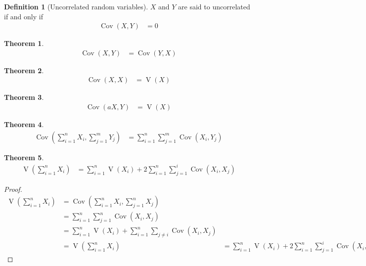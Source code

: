 \documentclass[titlepage, fleqn, a4paper, 12pt, twoside]{article}
\theoremstyle{definition}
\newtheorem{definition}{Definition}
\theoremstyle{theorem}
\newtheorem{theorem}{Theorem}
\DeclareMathOperator{\var}{\mathrm{V}}
\DeclareMathOperator{\cov}{\mathrm{Cov}}
\begin{document}
\begin{definition}[Uncorrelated random variables]
	$X$ and $Y$ are said to uncorrelated if and only if
	\begin{align*}
		\cov(X,Y) & = 0
	\end{align*}
\end{definition}

\begin{theorem}
	\begin{align*}
		\cov(X,Y) & = \cov(Y,X)
	\end{align*}
\end{theorem}

\begin{theorem}
	\begin{align*}
		\cov(X,X) & = \var(X)
	\end{align*}
\end{theorem}

\begin{theorem}
	\begin{align*}
		\cov(a X,Y) & = \var(X)
	\end{align*}
\end{theorem}

\begin{theorem}
	\begin{align*}
		\cov\left( \sum\limits_{i = 1}^{n} X_i , \sum\limits_{j = 1}^{m} Y_j \right) & = \sum\limits_{i = 1}^{n} \sum\limits_{j = 1}^{m} \cov(X_i,Y_j)
	\end{align*}
\end{theorem}

\begin{theorem}
	\begin{align*}
		\var\left( \sum\limits_{i = 1}^{n} X_i \right) & = \sum\limits_{i = 1}^{n} \var(X_i) + 2 \sum\limits_{i = 1}^{n} \sum\limits_{j = 1}^{i} \cov(X_i,X_j)
	\end{align*}
\end{theorem}

\begin{proof}
	\begin{align*}
		\var\left( \sum\limits_{i = 1}^{n} X_i \right) & = \cov(\sum\limits_{i = 1}^{n} X_i , \sum\limits_{j = 1}^{n} X_j)                                  \\
                                                               & = \sum\limits_{i = 1}^{n} \sum\limits_{j = 1}^{n} \cov\left( X_i,X_j \right)                       \\
                                                               & = \sum\limits_{i = 1}^{n} \var(X_i) + \sum\limits_{i = 1}^{n} \sum\limits_{j \neq i} \cov(X_i,X_j) \\
                                                               & = \var\left( \sum\limits_{i = 1}^{n} X_i \right)                                                    & = \sum\limits_{i = 1}^{n} \var(X_i) + 2 \sum\limits_{i = 1}^{n} \sum\limits_{j = 1}^{i} \cov(X_i,X_j)
	\end{align*}
\end{proof}
\end{document}
